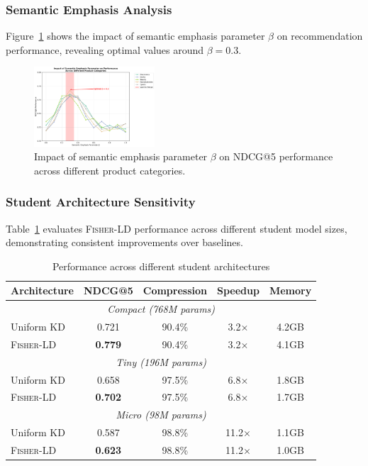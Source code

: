 \documentclass[10pt,conference]{IEEEtran}
\newcommand{\fisherld}{\textsc{Fisher-LD}}
\begin{document}
\subsubsection{Semantic Emphasis Analysis}

Figure~\ref{fig:semantic_emphasis} shows the impact of semantic emphasis parameter $\beta$ on recommendation performance, revealing optimal values around $\beta = 0.3$.

\begin{figure}[t]
\centering
\includegraphics[width=0.40\textwidth]{figures/semantic_emphasis_analysis.png}
\caption{Impact of semantic emphasis parameter $\beta$ on NDCG@5 performance across different product categories.}
\label{fig:semantic_emphasis}
\end{figure}

\subsubsection{Student Architecture Sensitivity}

Table~\ref{tab:student_architectures} evaluates \fisherld{} performance across different student model sizes, demonstrating consistent improvements over baselines.

\begin{table}[t]
\centering
\caption{Performance across different student architectures}
\label{tab:student_architectures}
\begin{tabular}{lcccc}
\toprule
Architecture & NDCG@5 & Compression & Speedup & Memory \\
\midrule
\multicolumn{5}{c}{\textit{Compact (768M params)}} \\
Uniform KD & 0.721 & 90.4\% & 3.2× & 4.2GB \\
\fisherld{} & \textbf{0.779} & 90.4\% & 3.2× & 4.1GB \\
\midrule
\multicolumn{5}{c}{\textit{Tiny (196M params)}} \\
Uniform KD & 0.658 & 97.5\% & 6.8× & 1.8GB \\
\fisherld{} & \textbf{0.702} & 97.5\% & 6.8× & 1.7GB \\
\midrule
\multicolumn{5}{c}{\textit{Micro (98M params)}} \\
Uniform KD & 0.587 & 98.8\% & 11.2× & 1.1GB \\
\fisherld{} & \textbf{0.623} & 98.8\% & 11.2× & 1.0GB \\
\bottomrule
\end{tabular}
\end{table}
\end{document}
